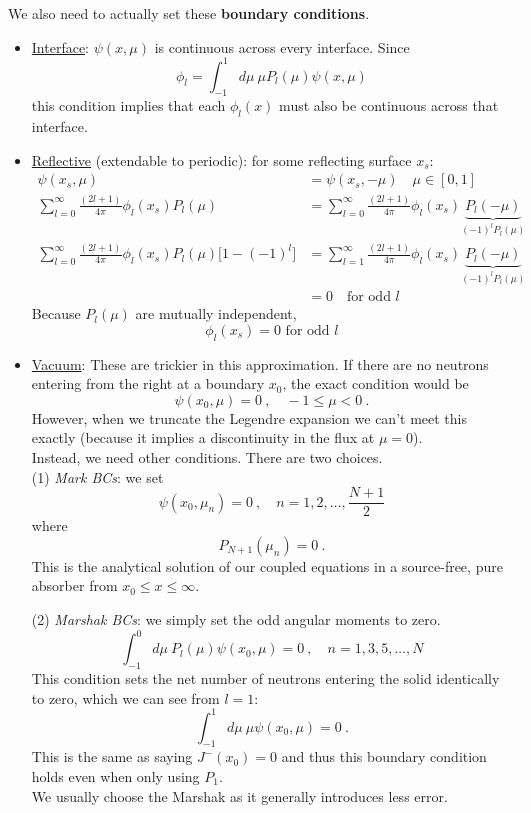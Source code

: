 \documentclass[12pt]{article}
\begin{document}
We also need to actually set these \textbf{boundary conditions}.
\begin{itemize}
\item \underline{Interface}: $\psi(x,\mu)$ is continuous across every interface. Since
\[
\phi_l = \int_{-1}^1 d\mu\: \mu P_{l}(\mu)\psi(x,\mu)
\]
this condition implies that each $\phi_l(x)$ must also be continuous across that interface. 

\item \underline{Reflective} (extendable to periodic): for some reflecting surface $x_s$:
\begin{align*}
\psi(x_s,\mu) &= \psi(x_s,-\mu) \quad \mu \in [0,1]\\
\sum_{l=0}^{\infty} \frac{(2l+1)}{4\pi}\phi_l(x_s)P_l(\mu) &= \sum_{l=0}^{\infty} \frac{(2l+1)}{4\pi}\phi_l(x_s)\underbrace{P_l(-\mu)}_{(-1)^l P_l(\mu)}\\
\sum_{l=0}^{\infty} \frac{(2l+1)}{4\pi}\phi_l(x_s)P_l(\mu)\bigl[1 - (-1)^l\bigr] &= \sum_{l=1}^{\infty} \frac{(2l+1)}{4\pi}\phi_l(x_s)\underbrace{P_l(-\mu)}_{(-1)^l P_l(\mu)}\\
&= 0 \quad \text{for odd }l
\end{align*}
Because $P_l(\mu)$ are mutually independent, 
\[\boxed{\phi_l(x_s) =0\text{ for odd }l}\]

\item \underline{Vacuum}: These are trickier in this approximation. If there are no neutrons entering from the right at a boundary $x_0$, the exact condition would be
\[
\psi(x_0, \mu) = 0\:, \quad -1 \leq \mu < 0\:.
\]
However, when we truncate the Legendre expansion we can't meet this exactly (because it implies a discontinuity in the flux at $\mu=0$).\\
Instead, we need other conditions. There are two choices.\\
(1) \textit{Mark BCs}: we set
\[
\psi(x_0, \mu_n) = 0\:, \quad n = 1, 2, \dots, \frac{N+1}{2}
\]
where 
\[
P_{N+1}(\mu_n) = 0\:.
\]
This is the analytical solution of our coupled equations in a source-free, pure absorber from $x_0 \leq x \leq \infty$.

(2) \textit{Marshak BCs}: we simply set the odd angular moments to zero. 
\[
\int_{-1}^0 d\mu\: P_{l}(\mu)\psi(x_0,\mu) = 0\:, \quad n = 1, 3, 5, \dots, N
\]
This condition sets the net number of neutrons entering the solid identically to zero, which we can see from $l=1$:
\[
\int_{-1}^1 d\mu\: \mu \psi(x_0,\mu) = 0\:.
\]
This is the same as saying $J^-(x_0) = 0$ and thus this boundary condition holds even when only using $P_1$. \\
We usually choose the Marshak as it generally introduces less error.  
\end{itemize}
\end{document}
